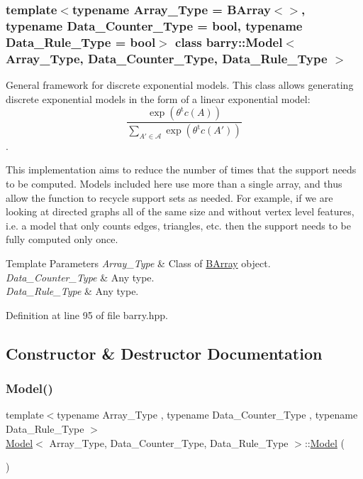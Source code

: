 \subsubsection*{template$<$typename Array\+\_\+\+Type = B\+Array$<$$>$, typename Data\+\_\+\+Counter\+\_\+\+Type = bool, typename Data\+\_\+\+Rule\+\_\+\+Type = bool$>$\newline
class barry\+::\+Model$<$ Array\+\_\+\+Type, Data\+\_\+\+Counter\+\_\+\+Type, Data\+\_\+\+Rule\+\_\+\+Type $>$}

General framework for discrete exponential models. This class allows generating discrete exponential models in the form of a linear exponential model\+: \[ \frac{ \exp{\left(\theta^{\mbox{t}}c(A)\right)} }{ \sum_{A'\in \mathcal{A}}\exp{\left(\theta^{\mbox{t}}c(A')\right)} } \]. 

This implementation aims to reduce the number of times that the support needs to be computed. Models included here use more than a single array, and thus allow the function to recycle support sets as needed. For example, if we are looking at directed graphs all of the same size and without vertex level features, i.\+e. a model that only counts edges, triangles, etc. then the support needs to be fully computed only once.


\begin{DoxyTemplParams}{Template Parameters}
{\em Array\+\_\+\+Type} & Class of {\ttfamily \hyperlink{classbarry_1_1_b_array}{B\+Array}} object. \\
\hline
{\em Data\+\_\+\+Counter\+\_\+\+Type} & Any type. \\
\hline
{\em Data\+\_\+\+Rule\+\_\+\+Type} & Any type. \\
\hline
\end{DoxyTemplParams}


Definition at line 95 of file barry.\+hpp.



\subsection{Constructor \& Destructor Documentation}
\mbox{\label{classbarry_1_1_model_a29e6e0c37d9a892772c5ee95ce1e1043}} 
\subsubsection{\texorpdfstring{Model()}{Model()}\hspace{0.1cm}{\footnotesize\ttfamily [1/3]}}
{\footnotesize\ttfamily template$<$typename Array\+\_\+\+Type , typename Data\+\_\+\+Counter\+\_\+\+Type , typename Data\+\_\+\+Rule\+\_\+\+Type $>$ \\
\hyperlink{classbarry_1_1_model}{Model}$<$ Array\+\_\+\+Type, Data\+\_\+\+Counter\+\_\+\+Type, Data\+\_\+\+Rule\+\_\+\+Type $>$\+::\hyperlink{classbarry_1_1_model}{Model} (\begin{DoxyParamCaption}{ }\end{DoxyParamCaption})\hspace{0.3cm}{\ttfamily [inline]}}



